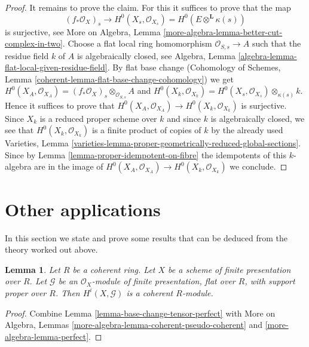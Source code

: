 \documentclass{stacks-project}
\theoremstyle{plain}
\newtheorem{lemma}[subsection]{Lemma}
\theoremstyle{definition}
\theoremstyle{remark}
\numberwithin{equation}{subsection}
\begin{document}
\begin{proof}
\medskip\noindent
It remains to prove the claim. For this it suffices to prove that the map
$$
(f_*\mathcal{O}_X)_s
\longrightarrow
H^0(X_s, \mathcal{O}_{X_s}) = H^0(E \otimes^\mathbf{L} \kappa(s))
$$
is surjective, see
More on Algebra, Lemma \ref{more-algebra-lemma-better-cut-complex-in-two}.
Choose a flat local ring homomorphism $\mathcal{O}_{S, s} \to A$
such that the residue field $k$ of $A$ is algebraically closed, see
Algebra, Lemma \ref{algebra-lemma-flat-local-given-residue-field}.
By flat base change (Cohomology of Schemes, Lemma
\ref{coherent-lemma-flat-base-change-cohomology})
we get $H^0(X_A, \mathcal{O}_{X_A}) =
(f_*\mathcal{O}_X)_s \otimes_{\mathcal{O}_{S, s}} A$
and $H^0(X_k, \mathcal{O}_{X_k}) =
H^0(X_s, \mathcal{O}_{X_s}) \otimes_{\kappa(s)} k$.
Hence it suffices to prove that
$H^0(X_A, \mathcal{O}_{X_A}) \to H^0(X_k, \mathcal{O}_{X_k})$
is surjective. Since $X_k$ is a reduced proper scheme over $k$
and since $k$ is algebraically closed, we see that
$H^0(X_k, \mathcal{O}_{X_k})$ is a finite product of copies
of $k$ by the already used Varieties, Lemma
\ref{varieties-lemma-proper-geometrically-reduced-global-sections}.
Since by Lemma \ref{lemma-proper-idempotent-on-fibre}
the idempotents of this $k$-algebra are in the image
of $H^0(X_A, \mathcal{O}_{X_A}) \to H^0(X_k, \mathcal{O}_{X_k})$ we conclude.
\end{proof}





\section{Other applications}
\label{section-other-applications}

\noindent
In this section we state and prove some results that can be deduced
from the theory worked out above.

\begin{lemma}
\label{lemma-cohomology-over-coherent-ring}
Let $R$ be a coherent ring. Let $X$ be a scheme of finite presentation over $R$.
Let $\mathcal{G}$ be an $\mathcal{O}_X$-module of finite presentation,
flat over $R$, with support proper over $R$. Then
$H^i(X, \mathcal{G})$ is a coherent $R$-module.
\end{lemma}

\begin{proof}
Combine Lemma \ref{lemma-base-change-tensor-perfect} with
More on Algebra, Lemmas \ref{more-algebra-lemma-coherent-pseudo-coherent} and
\ref{more-algebra-lemma-perfect}.
\end{proof}
\end{document}
